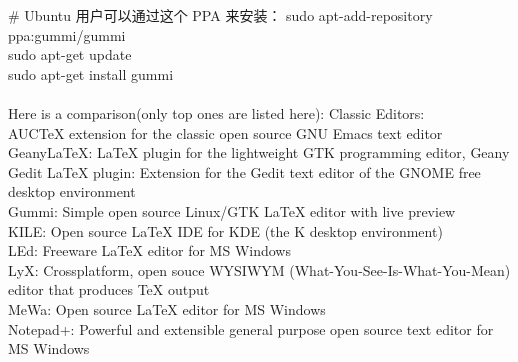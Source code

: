 \documentclass{article}
\begin{document}
\# Ubuntu 用户可以通过这个 PPA 来安装：
    sudo apt-add-repository ppa:gummi/gummi\\
    sudo apt-get update\\
    sudo apt-get install gummi\\
\\
Here is a comparison(only top ones are listed here):
Classic Editors:\\
AUCTeX extension for the classic open source GNU Emacs text editor\\
    GeanyLaTeX: LaTeX plugin for the lightweight GTK programming editor, Geany\\
    Gedit LaTeX plugin: Extension for the Gedit text editor of the GNOME free desktop environment\\
    Gummi: Simple open source Linux/GTK LaTeX editor with live preview\\
    KILE: Open source LaTeX IDE for KDE (the K desktop environment)\\
    LEd: Freeware LaTeX editor for MS Windows\\
    LyX: Crossplatform, open souce WYSIWYM (What-You-See-Is-What-You-Mean) editor that produces TeX output\\
    MeWa: Open source LaTeX editor for MS Windows\\
    Notepad+: Powerful and extensible general purpose open source text editor for MS Windows\\
    
\end{document}
